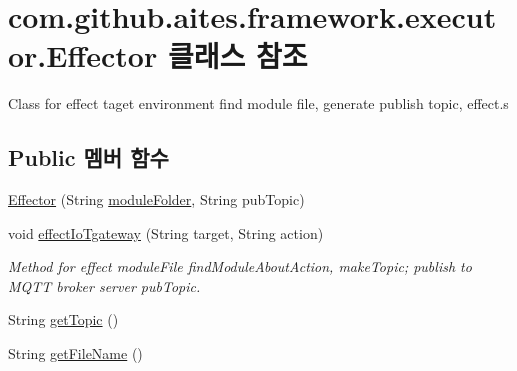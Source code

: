 \hypertarget{classcom_1_1github_1_1aites_1_1framework_1_1executor_1_1_effector}{}\section{com.\+github.\+aites.\+framework.\+executor.\+Effector 클래스 참조}
\label{classcom_1_1github_1_1aites_1_1framework_1_1executor_1_1_effector}


Class for effect taget environment find module file, generate publish topic, effect.\+s  


\subsection*{Public 멤버 함수}
\begin{DoxyCompactItemize}
\item 
\mbox{\hyperlink{classcom_1_1github_1_1aites_1_1framework_1_1executor_1_1_effector_ad2c4c0921965aa0e0aa450e033b25706}{Effector}} (String \mbox{\hyperlink{classcom_1_1github_1_1aites_1_1framework_1_1executor_1_1_effector_abd3712d877c8ff7227be30b6503f2475}{module\+Folder}}, String pub\+Topic)
\item 
void \mbox{\hyperlink{classcom_1_1github_1_1aites_1_1framework_1_1executor_1_1_effector_a2d1c773b1c83789a3ffb01cd32bfb276}{effect\+Io\+Tgateway}} (String target, String action)
\begin{DoxyCompactList}\small\item\em Method for effect module\+File find\+Module\+About\+Action, make\+Topic; publish to M\+Q\+TT broker server pub\+Topic. \end{DoxyCompactList}\item 
String \mbox{\hyperlink{classcom_1_1github_1_1aites_1_1framework_1_1executor_1_1_effector_a32701bc6b0551ff24afdb6a23f759647}{get\+Topic}} ()
\item 
String \mbox{\hyperlink{classcom_1_1github_1_1aites_1_1framework_1_1executor_1_1_effector_adc2b5fde4f917d55b836591376a75e86}{get\+File\+Name}} ()
\end{DoxyCompactItemize}
